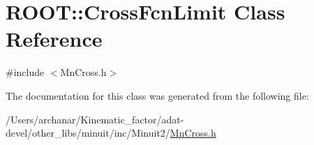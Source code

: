 \hypertarget{classROOT_1_1Minuit2_1_1MnCross_1_1CrossFcnLimit}{}\section{R\+O\+OT\+:\+:Cross\+Fcn\+Limit Class Reference}
\label{classROOT_1_1Minuit2_1_1MnCross_1_1CrossFcnLimit}


{\ttfamily \#include $<$Mn\+Cross.\+h$>$}



The documentation for this class was generated from the following file\+:\begin{DoxyCompactItemize}
\item 
/\+Users/archanar/\+Kinematic\+\_\+factor/adat-\/devel/other\+\_\+libs/minuit/inc/\+Minuit2/\mbox{\hyperlink{adat-devel_2other__libs_2minuit_2inc_2Minuit2_2MnCross_8h}{Mn\+Cross.\+h}}\end{DoxyCompactItemize}
